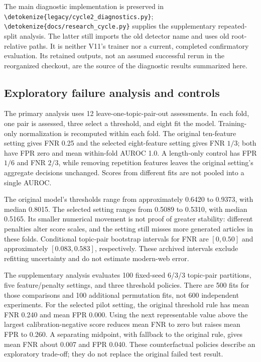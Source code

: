 \documentclass[11pt]{article}
\newcommand{\code}[1]{\expandafter\nolinkurl\expandafter{\detokenize{#1}}}
\begin{document}
The main diagnostic implementation is preserved in
\code{legacy/cycle2_diagnostics.py}; \code{docs/research_cycle.py} supplies
the supplementary repeated-split analysis. The latter still imports the
old detector name and uses old root-relative paths. It is neither V11's
trainer nor a current, completed confirmatory evaluation. Its retained
outputs, not an assumed successful rerun in the reorganized checkout, are
the source of the diagnostic results summarized here.

\subsection{Exploratory failure analysis and controls}
The primary analysis uses 12 leave-one-topic-pair-out assessments. In each
fold, one pair is assessed, three select a threshold, and eight fit the
model. Training-only normalization is recomputed within each fold. The
original ten-feature setting gives FNR 0.25 and the selected eight-feature
setting gives FNR $1/3$; both have FPR zero and mean within-fold AUROC 1.0.
A length-only control has FPR $1/6$ and FNR $2/3$, while removing repetition
features leaves the original setting's aggregate decisions unchanged.
Scores from different fits are not pooled into a single AUROC.

The original model's thresholds range from approximately 0.6420 to 0.9373,
with median 0.8015. The selected setting ranges from 0.5089 to 0.5310,
with median 0.5165. Its smaller numerical movement is not proof of greater
stability: different penalties alter score scales, and the setting still
misses more generated articles in these folds. Conditional topic-pair
bootstrap intervals for FNR are $[0,0.50]$ and approximately
$[0.083,0.583]$, respectively. These archived intervals exclude refitting
uncertainty and do not estimate modern-web error.

The supplementary analysis evaluates 100 fixed-seed 6/3/3 topic-pair
partitions, five feature/penalty settings, and three threshold policies.
There are 500 fits for those comparisons and 100 additional permutation
fits, not 600 independent experiments. For the selected pilot setting,
the original threshold rule has mean FNR 0.240 and mean FPR 0.000. Using
the next representable value above the largest calibration-negative score
reduces mean FNR to zero but raises mean FPR to 0.260. A separating midpoint,
with fallback to the original rule, gives mean FNR about 0.007 and FPR 0.040.
These counterfactual policies describe an exploratory trade-off; they do not
replace the original failed test result.
\end{document}
